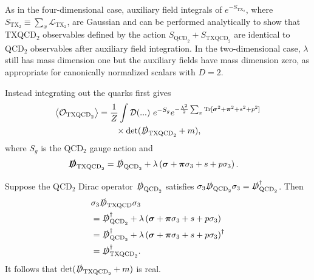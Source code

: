\documentclass[%
    twocolumn,
superscriptaddress,
preprintnumbers,
nofootinbib,
 amsmath,amssymb,
 aps,
 prd,
 floatfix,
]{revtex4-2}
\newcommand{\tx}[0]{\text{TX}}
\newcommand{\qcd}[0]{\text{QCD}}
\newcommand{\txqcd}[0]{\text{TXQCD}}
\begin{document}
As in the four-dimensional case, auxiliary field integrals of $e^{-S_{\tx_2}}$, where $S_{\tx_2} \equiv \sum_x \mathcal{L}_{\tx_2}$, are Gaussian and can be performed analytically to show that TXQCD$_2$ observables defined by the action $S_{\qcd_2} + S_{\txqcd_2}$ are identical to QCD$_2$ observables after auxiliary field integration.
In the two-dimensional case, $\lambda$ still has mass dimension one but the auxiliary fields have mass dimension zero, as appropriate for canonically normalized scalars with $D=2$.


Instead integrating out the quarks first gives
\begin{equation}\label{eq:TXQCD2}
\begin{split}
\left< \mathcal{O}_{\txqcd_2} \right> 
&= \frac{1}{Z} \int \mathcal{D}(...) \ e^{-S_g} e^{-\frac{\lambda^2}{2} \sum_x \text{Tr}[\bm{\sigma}^2+ \bm{\pi}^2 + s^2 + p^2 ]} \\
&\hspace{20pt} \times \det(\slashed{D}_{\txqcd_2} + m),
\end{split}
\end{equation}
where $S_g$ is the QCD$_2$ gauge action and
\begin{equation}
\begin{split}
  \bm{\slashed{D}}_{\txqcd_2} &= \slashed{D}_{\qcd_2} + \lambda\left( \bm{\sigma} + \bm{\pi} \sigma_3  + s + p \sigma_3 \right).
    \end{split}
\end{equation}


Suppose the QCD$_2$ Dirac operator $\slashed{D}_{\qcd_2}$ satisfies $\sigma_3 \slashed{D}_{\qcd_2} \sigma_3 = \slashed{D}_{\qcd_2}^\dagger$.
Then
\begin{equation}
\begin{split}
    &\sigma_3 \slashed{D}_{\txqcd} \sigma_3 \\
    &= \slashed{D}_{\qcd_2}^\dagger + \lambda \left(\bm{\sigma} + \bm{\pi} \sigma_3  + s + p \sigma_3\right) \\
    &= \slashed{D}_{\qcd_2}^\dagger + \lambda \left( \bm{\sigma} + \bm{\pi} \sigma_3  + s + p \sigma_3 \right)^\dagger \\
    &= \slashed{D}_{\txqcd_2}^\dagger.
    \end{split}
\end{equation}
It follows that $\det(\slashed{D}_{\txqcd_2} + m)$ is real.
\end{document}
